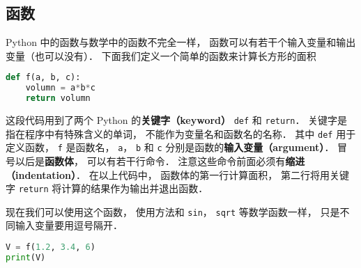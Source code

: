 \subsection{函数}
Python 中的函数与数学中的函数不完全一样， 函数可以有若干个输入变量和输出变量（也可以没有）． 下面我们定义一个简单的函数来计算长方形的面积
\begin{lstlisting}[language=python]
def f(a, b, c):
    volumn = a*b*c
    return volumn
\end{lstlisting}
这段代码用到了两个 Python 的\textbf{关键字（keyword）} \verb|def| 和 \verb|return|． 关键字是指在程序中有特殊含义的单词， 不能作为变量名和函数名的名称． 其中 \verb|def| 用于定义函数， \verb|f| 是函数名， \verb|a|， \verb|b| 和 \verb|c| 分别是函数的\textbf{输入变量（argument）}． 冒号以后是\textbf{函数体}， 可以有若干行命令． 注意这些命令前面必须有\textbf{缩进（indentation）}．  在以上代码中， 函数体的第一行计算面积， 第二行将用关键字 \verb|return| 将计算的结果作为输出并退出函数．

现在我们可以使用这个函数， 使用方法和 \verb|sin|， \verb|sqrt| 等数学函数一样， 只是不同输入变量要用逗号隔开．
\begin{lstlisting}[language=python]
V = f(1.2, 3.4, 6)
print(V)
\end{lstlisting}

